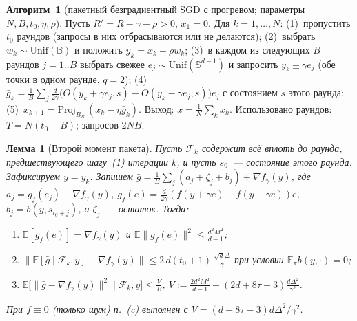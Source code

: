 \documentclass[11pt,a4paper]{article}
\numberwithin{equation}{section}
\newtheorem{lemma}[theorem]{Лемма}
\theoremstyle{definition}
\theoremstyle{remark}
\newcommand{\E}{\mathbb E}\newcommand{\R}{\mathbb R}\newcommand{\N}{\mathbb N}\let\Prob\relax\newcommand{\Prob}{\mathbb P}
\newcommand{\norm}[1]{\lVert #1\rVert}\newcommand{\abs}[1]{\lvert #1\rvert}\newcommand{\ip}[2]{\langle #1,#2\rangle}
\newcommand{\Unif}{\mathrm{Unif}}\newcommand{\TV}{\mathrm{TV}}\newcommand{\tmix}{t_{\rm mix}}
\newcommand{\Sph}{\mathbb S^{d-1}}\newcommand{\Ball}{\mathbb B}
\begin{document}
\noindent\textbf{Алгоритм~1} (пакетный безградиентный SGD с прогревом; параметры $N,B,t_0,\eta,\rho$). Пусть $R'=R-\gamma-\rho>0$, $x_1=0$. Для $k=1,\dots,N$:
(1)~пропустить $t_0$ раундов (запросы в них отбрасываются или не делаются);
(2)~выбрать $w_k\sim\Unif(\Ball)$ и положить $y_k=x_k+\rho w_k$;
(3)~в каждом из следующих $B$ раундов $j=1..B$ выбрать свежее $e_j\sim\Unif(\Sph)$ и запросить $y_k\pm\gamma e_j$ (обе точки в одном раунде, $q=2$);
(4)~$\bar g_k=\frac1B\sum_j\frac d{2\gamma}\big(O(y_k+\gamma e_j,s)-O(y_k-\gamma e_j,s)\big)e_j$ с состоянием $s$ этого раунда;
(5)~$x_{k+1}=\mathrm{Proj}_{B_{R'}}(x_k-\eta\bar g_k)$.
Выход: $\bar x=\frac1N\sum_kx_k$. Использовано раундов: $T=N(t_0+B)$; запросов $2NB$.

\begin{lemma}[Второй момент пакета]\label{lem:var}
Пусть $\mathcal F_k$ содержит всё вплоть до раунда, предшествующего шагу~(1) итерации $k$, и пусть $s_0$~--- состояние этого раунда. Зафиксируем $y=y_k$. Запишем $\bar g=\frac1B\sum_j(a_j+\zeta_j+b_j)+\nabla f_\gamma(y)$, где $a_j=g_f(e_j)-\nabla f_\gamma(y)$, $g_f(e)=\frac d{2\gamma}(f(y+\gamma e)-f(y-\gamma e))e$, $b_j=b(y,s_{t_0+j})$, а $\zeta_j$~--- остаток. Тогда:
\begin{enumerate}[label=(\alph*)]
\item $\E[g_f(e)]=\nabla f_\gamma(y)$ и $\E\norm{g_f(e)}^2\le\frac{d^2M^2}{d-1}$;
\item $\big\|\E[\bar g\mid\mathcal F_k,y]-\nabla f_\gamma(y)\big\|\le2\,d(t_0+1)\,\frac{\sqrt d\Delta}\gamma$ при условии $\E_\pi b(y,\cdot)=0$;
\item $\E\big[\norm{\bar g-\nabla f_\gamma(y)}^2\mid\mathcal F_k,y\big]\le\frac VB$, \quad $V:=\frac{2d^2M^2}{d-1}+(2d+8\tau-3)\frac{d\Delta^2}{\gamma^2}$.
\end{enumerate}
При $f\equiv0$ (только шум) п.~(c) выполнен с $V=(d+8\tau-3)d\Delta^2/\gamma^2$.
\end{lemma}
\end{document}
